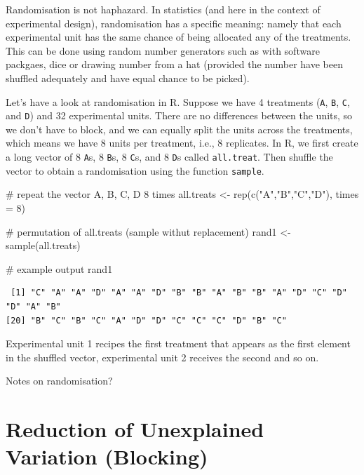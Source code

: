 \documentclass[
  letterpaper,
  DIV=11,
  numbers=noendperiod,
  oneside]{scrreprt}
\newenvironment{Shaded}{\begin{snugshade}}{\end{snugshade}}
\newcommand{\AttributeTok}[1]{\textcolor[rgb]{0.40,0.45,0.13}{#1}}
\newcommand{\CommentTok}[1]{\textcolor[rgb]{0.37,0.37,0.37}{#1}}
\newcommand{\DecValTok}[1]{\textcolor[rgb]{0.68,0.00,0.00}{#1}}
\newcommand{\FunctionTok}[1]{\textcolor[rgb]{0.28,0.35,0.67}{#1}}
\newcommand{\NormalTok}[1]{\textcolor[rgb]{0.00,0.23,0.31}{#1}}
\newcommand{\OtherTok}[1]{\textcolor[rgb]{0.00,0.23,0.31}{#1}}
\newcommand{\StringTok}[1]{\textcolor[rgb]{0.13,0.47,0.30}{#1}}
\begin{document}
Randomisation is not haphazard. In statistics (and here in the context
of experimental design), randomisation has a specific meaning: namely
that each experimental unit has the same chance of being allocated any
of the treatments. This can be done using random number generators such
as with software packgaes, dice or drawing number from a hat (provided
the number have been shuffled adequately and have equal chance to be
picked).

Let's have a look at randomisation in R. Suppose we have 4 treatments
(\texttt{A}, \texttt{B}, \texttt{C}, and \texttt{D}) and 32 experimental
units. There are no differences between the units, so we don't have to
block, and we can equally split the units across the treatments, which
means we have 8 units per treatment, i.e., 8 replicates. In R, we first
create a long vector of 8 \texttt{A}s, 8 \texttt{B}s, 8 \texttt{C}s, and
8 \texttt{D}s called \texttt{all.treat}. Then shuffle the vector to
obtain a randomisation using the function \texttt{sample}.

\begin{Shaded}
\begin{Highlighting}[]
\CommentTok{\# repeat the vector A, B, C, D 8 times }
\NormalTok{all.treats }\OtherTok{\textless{}{-}} \FunctionTok{rep}\NormalTok{(}\FunctionTok{c}\NormalTok{(}\StringTok{"A"}\NormalTok{,}\StringTok{"B"}\NormalTok{,}\StringTok{"C"}\NormalTok{,}\StringTok{"D"}\NormalTok{), }\AttributeTok{times =} \DecValTok{8}\NormalTok{)}

\CommentTok{\# permutation of all.treats (sample withut replacement)}
\NormalTok{rand1 }\OtherTok{\textless{}{-}} \FunctionTok{sample}\NormalTok{(all.treats)}

\CommentTok{\# example output}
\NormalTok{rand1}
\end{Highlighting}
\end{Shaded}

\begin{verbatim}
 [1] "C" "A" "A" "D" "A" "A" "D" "B" "B" "A" "B" "B" "A" "D" "C" "D" "D" "A" "B"
[20] "B" "C" "B" "C" "A" "D" "D" "C" "C" "C" "D" "B" "C"
\end{verbatim}

Experimental unit 1 recipes the first treatment that appears as the
first element in the shuffled vector, experimental unit 2 receives the
second and so on.

Notes on randomisation?

\section{Reduction of Unexplained Variation
(Blocking)}\label{reduction-of-unexplained-variation-blocking}
\end{document}
